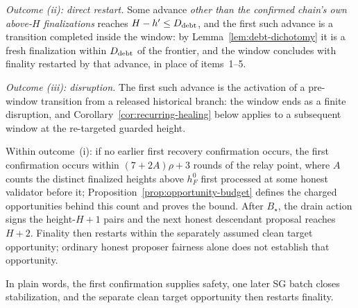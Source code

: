 \begin{theorem}
\emph{Outcome (ii): direct restart.}  Some advance \emph{other than
the confirmed chain's own above-\(H\) finalizations} reaches
\(H-h'\leq D_{\rm debt}\), and the first such advance is a
transition completed inside the window: by
Lemma~\ref{lem:debt-dichotomy} it is a fresh finalization within
\(D_{\rm debt}\) of the frontier, and the window concludes with
finality restarted by that advance, in place of items~1--5.

\emph{Outcome (iii): disruption.}  The first such advance is the
activation of a pre-window transition from a released historical
branch: the window ends as a finite disruption, and
Corollary~\ref{cor:recurring-healing} below applies to a subsequent
window at the re-targeted guarded height.

Within outcome~(i): if no earlier first recovery confirmation occurs,
the first confirmation occurs within \((7+2A)\rho+3\) rounds of the
relay point, where \(A\) counts the distinct finalized heights
above \(h_F^0\) first processed at some honest validator before it;
Proposition~\ref{prop:opportunity-budget} defines the charged
opportunities behind this count and proves the bound.  After
\(B_\star\), the drain action signs the height-\(H+1\) pairs and
the next honest descendant proposal reaches \(H+2\).  Finality then
restarts within the separately assumed clean target opportunity;
ordinary honest proposer fairness alone does not establish that
opportunity.

In plain words, the first confirmation supplies safety, one later SG batch
closes stabilization, and the separate clean target opportunity then
restarts finality.
\end{theorem}

